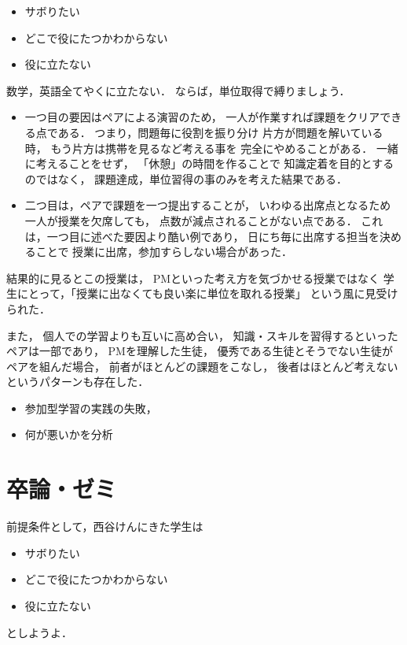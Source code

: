 \documentclass{jsarticle}
\begin{document}
\begin{itemize}
\item サボりたい
\item どこで役にたつかわからない
\item 役に立たない
\end{itemize}
数学，英語全てやくに立たない．
ならば，単位取得で縛りましょう．

\begin{itemize}
\item 一つ目の要因はペアによる演習のため，
一人が作業すれば課題をクリアできる点である．
つまり，問題毎に役割を振り分け 
片方が問題を解いている時，
もう片方は携帯を見るなど考える事を
完全にやめることがある．
一緒に考えることをせず，
「休憩」の時間を作ることで
知識定着を目的とするのではなく，
課題達成，単位習得の事のみを考えた結果である．

\item 二つ目は，ペアで課題を一つ提出することが，
いわゆる出席点となるため
一人が授業を欠席しても，
点数が減点されることがない点である．
これは，一つ目に述べた要因より酷い例であり，
日にち毎に出席する担当を決めることで
授業に出席，参加すらしない場合があった．
\end{itemize}

結果的に見るとこの授業は，
PMといった考え方を気づかせる授業ではなく
学生にとって，「授業に出なくても良い楽に単位を取れる授業」
という風に見受けられた．

また，
個人での学習よりも互いに高め合い，
知識・スキルを習得するといったペアは一部であり，
PMを理解した生徒，
優秀である生徒とそうでない生徒がペアを組んだ場合，
前者がほとんどの課題をこなし，
後者はほとんど考えないというパターンも存在した．

\begin{itemize}
\item 参加型学習の実践の失敗，
\item 何が悪いかを分析
\end{itemize}


\section{卒論・ゼミ}
\label{sec:orge1b361a}
前提条件として，西谷けんにきた学生は
\begin{itemize}
\item サボりたい
\item どこで役にたつかわからない
\item 役に立たない
\end{itemize}
としようよ．
\end{document}
